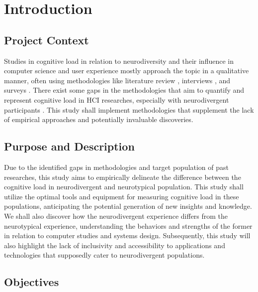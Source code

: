 \chapter{Introduction}
\section{Project Context}

Studies in cognitive load in relation to neurodiversity and their influence in computer science and user experience mostly approach the topic in a qualitative manner, often using methodologies like literature review \cite{burtscher2024, hart2006, kosch2023, liu2024, skulmowski2022, spiel2022, stefanidi2022, wollberg2025, cognitive2025}, interviews \cite{hall2024, lowy2023}, and surveys \cite{conrad2023, robertson2024}. There exist some gaps in the methodologies that aim to quantify and represent cognitive load in HCI researches, especially with neurodivergent participants \cite{lecunff2024}. This study shall implement methodologies that supplement the lack of empirical approaches and potentially invaluable discoveries.

\section{Purpose and Description}

Due to the identified gaps in methodologies and target population of past researches, this study aims to empirically delineate the difference between the cognitive load in neurodivergent and neurotypical population. This study shall utilize the optimal tools and equipment for measuring cognitive load \cite{ahmad2023, appel2019, babu2018, baceviciute2020, hart2006, kosch2023, pretty2024} in these populations, anticipating the potential generation of new insights and knowledge. We shall also discover how the neurodivergent experience differs from the neurotypical experience, understanding the behaviors \cite{hall2024, lowy2023} and strengths \cite{stefanidi2022} of the former in relation to computer studies and systems design. Subsequently, this study will also highlight the lack of inclusivity \cite{lowy2023, wollberg2025} and accessibility \cite{elglaly2024, kuang2024, le2024} to applications and technologies that supposedly cater to neurodivergent populations.

\section{Objectives}

